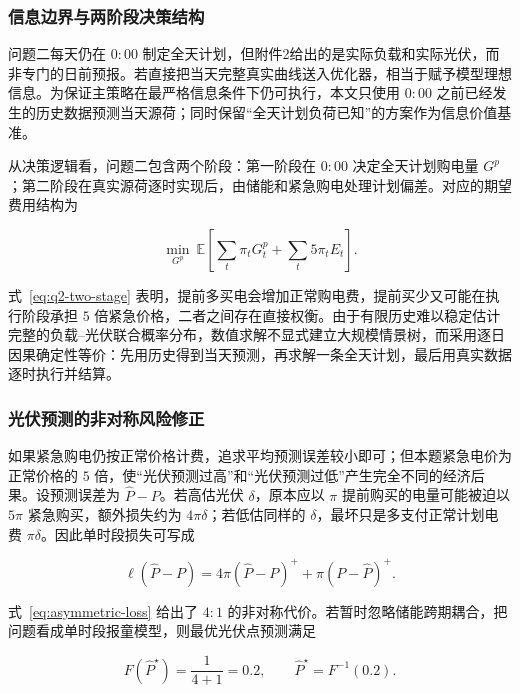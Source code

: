 \subsubsection{信息边界与两阶段决策结构}

问题二每天仍在 $0{:}00$ 制定全天计划，但附件2给出的是实际负载和实际光伏，而非专门的日前预报。若直接把当天完整真实曲线送入优化器，相当于赋予模型理想信息。为保证主策略在最严格信息条件下仍可执行，本文只使用 $0{:}00$ 之前已经发生的历史数据预测当天源荷；同时保留“全天计划负荷已知”的方案作为信息价值基准。

从决策逻辑看，问题二包含两个阶段：第一阶段在 $0{:}00$ 决定全天计划购电量 $G^p$；第二阶段在真实源荷逐时实现后，由储能和紧急购电处理计划偏差。对应的期望费用结构为

\begin{equation}
    \min_{G^p}\ \mathbb E\!\left[\sum_t\pi_tG^p_t+\sum_t5\pi_tE_t\right].
    \label{eq:q2-two-stage}
\end{equation}

式~\eqref{eq:q2-two-stage} 表明，提前多买电会增加正常购电费，提前买少又可能在执行阶段承担 $5$ 倍紧急价格，二者之间存在直接权衡。由于有限历史难以稳定估计完整的负载--光伏联合概率分布，数值求解不显式建立大规模情景树，而采用逐日因果确定性等价：先用历史得到当天预测，再求解一条全天计划，最后用真实数据逐时执行并结算。

\subsubsection{光伏预测的非对称风险修正}

如果紧急购电仍按正常价格计费，追求平均预测误差较小即可；但本题紧急电价为正常价格的 $5$ 倍，使“光伏预测过高”和“光伏预测过低”产生完全不同的经济后果。设预测误差为 $\hat P-P$。若高估光伏 $\delta$，原本应以 $\pi$ 提前购买的电量可能被迫以 $5\pi$ 紧急购买，额外损失约为 $4\pi\delta$；若低估同样的 $\delta$，最坏只是多支付正常计划电费 $\pi\delta$。因此单时段损失可写成

\begin{equation}
    \ell(\hat P-P)=4\pi(\hat P-P)^++\pi(P-\hat P)^+ .
    \label{eq:asymmetric-loss}
\end{equation}

式~\eqref{eq:asymmetric-loss} 给出了 $4{:}1$ 的非对称代价。若暂时忽略储能跨期耦合，把问题看成单时段报童模型，则最优光伏点预测满足

\begin{equation}
    F(\hat P^\star)=\frac{1}{4+1}=0.2,
    \qquad \hat P^\star=F^{-1}(0.2).
    \label{eq:newsvendor}
\end{equation}

